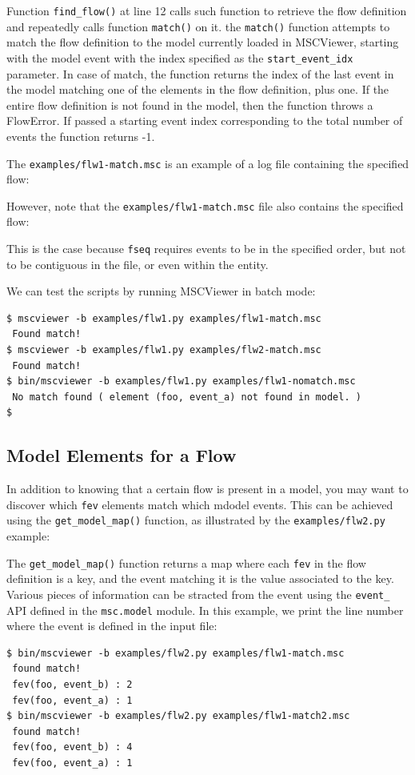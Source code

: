 \documentclass[11pt, twoside, titlepage]{book}
\newcommand{\prog}{MSCViewer}
\begin{document}
Function
\texttt{find\_flow()} at line 12 calls such function to retrieve the flow definition and repeatedly calls function
\texttt{match()} on it. the \texttt{match()} function attempts to match the flow definition to the model
currently loaded in \prog{}, starting with the model event with the index specified as the \texttt{start\_event\_idx}
parameter. In case of match, the function returns the index of the last event in the model matching one of the elements
in the flow definition, plus one. If the entire flow definition is not found in the model, then the function throws a
FlowError. If passed a starting event index corresponding to the total number of events the function returns -1. 


The \texttt{examples/flw1-match.msc} is an example of a log file containing the specified flow:


However, note that the \texttt{examples/flw1-match.msc} file also contains the specified flow:



This is the case because \texttt{fseq} requires events to be in the specified order, but
not to be contiguous in the file, or even within the entity. 

We can test the scripts by running \prog{} in batch mode:

\begin{verbatim}
$ mscviewer -b examples/flw1.py examples/flw1-match.msc 
 Found match!
$ mscviewer -b examples/flw1.py examples/flw2-match.msc 
 Found match!
$ bin/mscviewer -b examples/flw1.py examples/flw1-nomatch.msc
 No match found ( element (foo, event_a) not found in model. )
$\end{verbatim}

\subsection{Model Elements for a Flow}

In addition to knowing that a certain flow is present in a model, you may want to discover which 
\texttt{fev} elements match which mdodel events. This can be achieved using the \texttt{get\_model\_map()}
function, as illustrated by the \texttt{examples/flw2.py} example:



The \texttt{get\_model\_map()} function returns a map where each \texttt{fev} in the flow definition is a key,
and the event matching it is the value associated to the key. Various pieces of information 
can be stracted from the event using the \texttt{event\_} API defined in the \texttt{msc.model} module.
In this example, we print the line number where the event is defined in the input file:

\begin{verbatim}
$ bin/mscviewer -b examples/flw2.py examples/flw1-match.msc
 found match!
 fev(foo, event_b) : 2
 fev(foo, event_a) : 1
$ bin/mscviewer -b examples/flw2.py examples/flw1-match2.msc
 found match!
 fev(foo, event_b) : 4
 fev(foo, event_a) : 1
\end{verbatim}

\appendix

 
\printindex
\end{document}
